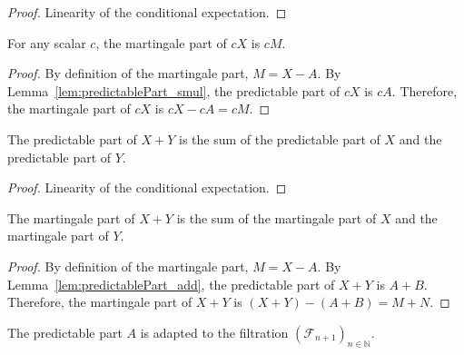 \begin{proof}\leanok
Linearity of the conditional expectation.
\end{proof}


\begin{lemma}\label{lem:martingalePart_smul}
  \mathlibok
For any scalar $c$, the martingale part of $c X$ is $c M$.
\end{lemma}

\begin{proof}\leanok
By definition of the martingale part, $M = X - A$. By Lemma~\ref{lem:predictablePart_smul}, the predictable part of $c X$ is $c A$. Therefore, the martingale part of $c X$ is $c X - c A = c M$.
\end{proof}


\begin{lemma}\label{lem:predictablePart_add}
  \mathlibok
The predictable part of $X + Y$ is the sum of the predictable part of $X$ and the predictable part of $Y$.
\end{lemma}

\begin{proof}\leanok
Linearity of the conditional expectation.
\end{proof}


\begin{lemma}\label{lem:martingalePart_add}
  \mathlibok
The martingale part of $X + Y$ is the sum of the martingale part of $X$ and the martingale part of $Y$.
\end{lemma}

\begin{proof}\leanok
By definition of the martingale part, $M = X - A$. By Lemma~\ref{lem:predictablePart_add}, the predictable part of $X + Y$ is $A + B$. Therefore, the martingale part of $X + Y$ is $(X + Y) - (A + B) = M + N$.
\end{proof}


\begin{lemma}\label{lem:adapted_predictablePart}
  \mathlibok
The predictable part $A$ is adapted to the filtration $(\mathcal{F}_{n+1})_{n \in \mathbb{N}}$.
\end{lemma}

